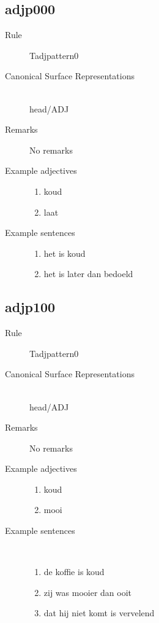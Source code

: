  \subsection{adjp000}
\begin{description}
  \item [Rule] Tadjpattern0
  \item [Canonical Surface Representations] \mbox{}\\ head/ADJ
  \item [Remarks] No remarks
  \item [Example adjectives]\mbox{}
\begin{enumerate}
  \item koud
  \item laat
\end{enumerate}
  \item [Example sentences]\mbox{}
\begin{enumerate}
  \item het is koud
  \item het is later dan bedoeld
\end{enumerate}
\end{description}
\subsection{adjp100}
\begin{description}
  \item [Rule] Tadjpattern0
  \item [Canonical Surface Representations]\mbox{}\\ head/ADJ
  \item [Remarks] No remarks
  \item [Example adjectives]\mbox{}

\begin{enumerate}
  \item koud
  \item mooi
\end{enumerate}
  \item [Example sentences]\mbox{}\\
 
\begin{enumerate}
  \item de koffie is koud
  \item zij was mooier dan ooit
  \item dat hij niet komt is vervelend 
\end{enumerate}
\end{description}
\newpage
